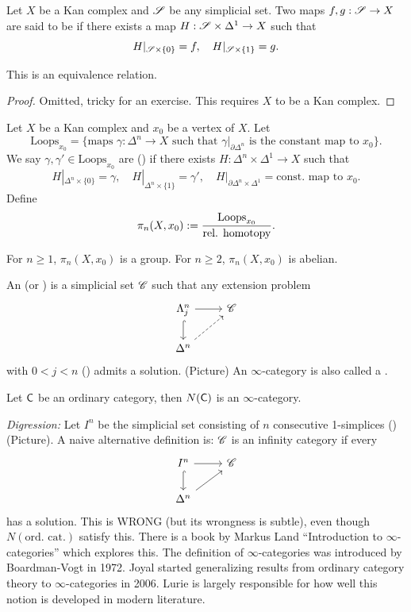 \begin{definition}
	Let $X$ be a Kan complex and $\mathscr S$ be any simplicial set. Two maps $f,g:\CS\to X$ are
	said to be  if there exists a map $H:\CS\times \Delta^{1}\to X$ such that
	\[
		H|_{\mathscr S\times \{0\} } = f,\quad H|_{\mathscr S\times \{1\} } = g.
	\]
\end{definition}
\begin{lemma}
	This is an equivalence relation.
\end{lemma}
\begin{proof}
	Omitted, tricky for an exercise. This requires $X$ to be a Kan complex.
\end{proof}
\begin{definition}
	Let $X$ be a Kan complex and $x_0$ be a vertex of $X$. Let
	\[
		\text{Loops}_{x_0} = \{\text{maps }\gamma:\Delta^{n}\to X\text{ such that
		}\gamma|_{\partial\Delta^{n}}\text{ is the constant map to }x_0\}.
	\]
	We say $\gamma,\gamma'\in \text{Loops}_{x_0}$ are 
	() if there exists $H:\Delta^{n}\times \Delta^{1}\to X$ such that
	\[
		H|_{\Delta^{n}\times \{0\} } = \gamma,\quad H|_{\Delta^{n}\times \{1\} } =
		\gamma',\quad H|_{\partial \Delta^{n}\times \Delta^{1}} = \text{const. map to }x_0.
	\]
	Define
	\[
		\pi_n(X,x_0) := \frac{\text{Loops}_{x_0}}{\text{rel. homotopy}}.
	\]
\end{definition}
\begin{fact}
	For $n\ge 1$, $\pi_n(X,x_0)$ is a group. For $n\ge 2$, $\pi_n(X,x_0)$ is abelian.
\end{fact}
\begin{definition}
	An  (or ) is a simplicial set $\mathscr C$ such
	that any extension problem
	\[
		\begin{tikzcd}
			\Lambda_{j}^{n} \ar[r] \ar[d,hook] & \CC \\
			\Delta^{n} \ar[ur, dashed]
		\end{tikzcd}
	\]
	with $0<j<n$ () admits a solution. (Picture) An $\infty$-category is
	also called a .
\end{definition}
\begin{lemma}
	Let $\mathsf{C}$ be an ordinary category, then $N(\mathsf{C})$ is an $\infty$-category.
\end{lemma}
\emph{Digression:} Let $I^{n}$ be the simplicial set consisting of $n$ consecutive
1-simplices () (Picture). A naive alternative definition is: $\mathscr C$ is an
infinity category if every
\[
	\begin{tikzcd}
		I^{n} \ar[r] \ar[d,hook] & \CC \\
		\Delta^{n} \ar[ur]
	\end{tikzcd}
\]
has a solution. This is WRONG (but its wrongness is subtle), even though $N(\text{ord.
cat.})$ satisfy this. There is a book by Markus Land ``Introduction to
$\infty$-categories'' which explores this. The definition of $\infty$-categories was
introduced by Boardman-Vogt in 1972. Joyal started generalizing results from ordinary
category theory to $\infty$-categories in 2006. Lurie is largely responsible for how well
this notion is developed in modern literature.

